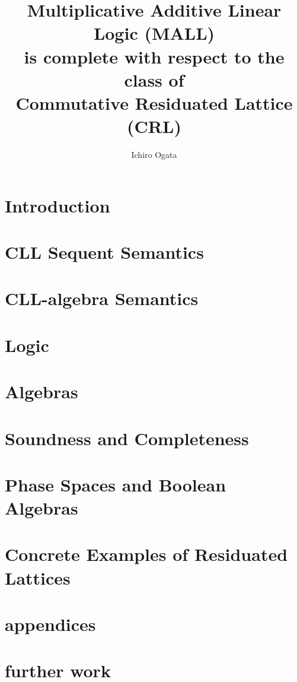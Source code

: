 \documentclass[11pt]{article} %
\title{Multiplicative Additive Linear Logic (MALL)  \\
 is complete  with respect to the class of \\
 Commutative Residuated Lattice (CRL)}
\author{Ichiro Ogata}
\begin{document}
\maketitle



\section{Introduction}


\section{CLL Sequent Semantics}


\section{CLL-algebra Semantics}








\section{Logic}


\section{Algebras}


\section{Soundness and Completeness}


\section{Phase Spaces and Boolean Algebras}

\section{Concrete Examples of Residuated Lattices}


\appendix
\section{appendices}







\section{further work}


\appendix 

 
\end{document}
